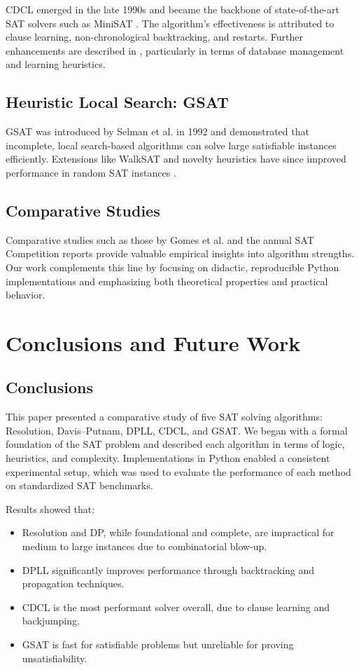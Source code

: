 \documentclass[11pt]{article}
\begin{document}
CDCL emerged in the late 1990s and became the backbone of state-of-the-art SAT solvers such as MiniSAT \cite{Een2003}. The algorithm's effectiveness is attributed to clause learning, non-chronological backtracking, and restarts. Further enhancements are described in \cite{Biere2009}, particularly in terms of database management and learning heuristics.

\subsection*{Heuristic Local Search: GSAT}

GSAT was introduced by Selman et al. in 1992 \cite{Selman1992} and demonstrated that incomplete, local search-based algorithms can solve large satisfiable instances efficiently. Extensions like WalkSAT and novelty heuristics have since improved performance in random SAT instances \cite{Hoos2000}.

\subsection*{Comparative Studies}

Comparative studies such as those by Gomes et al. \cite{Gomes2008} and the annual SAT Competition reports provide valuable empirical insights into algorithm strengths. Our work complements this line by focusing on didactic, reproducible Python implementations and emphasizing both theoretical properties and practical behavior.



\section{Conclusions and Future Work}

\subsection*{Conclusions}

This paper presented a comparative study of five SAT solving algorithms: Resolution, Davis–Putnam, DPLL, CDCL, and GSAT. We began with a formal foundation of the SAT problem and described each algorithm in terms of logic, heuristics, and complexity. Implementations in Python enabled a consistent experimental setup, which was used to evaluate the performance of each method on standardized SAT benchmarks.

Results showed that:
\begin{itemize}
    \item Resolution and DP, while foundational and complete, are impractical for medium to large instances due to combinatorial blow-up.
    \item DPLL significantly improves performance through backtracking and propagation techniques.
    \item CDCL is the most performant solver overall, due to clause learning and backjumping.
    \item GSAT is fast for satisfiable problems but unreliable for proving unsatisfiability.
\end{itemize}
\end{document}
